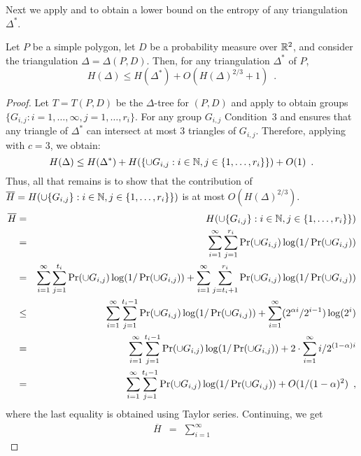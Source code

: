 \documentclass[lotsofwhite]{patmorin}
\begin{document}
Next we apply  and  to obtain a lower
bound on the entropy of any triangulation $\Delta^*$. 

\begin{lem}
Let $P$ be a simple polygon, let $D$ be a probability measure over
$\mathbb{R}^2$, and consider the triangulation $\Delta=\Delta(P,D)$.
Then, for any triangulation $\Delta^*$ of $P$,
\[
    H(\Delta) \le H(\Delta^*) + O(H(\Delta)^{2/3}+1) \enspace .
\]
\end{lem}

\begin{proof}
Let $T=T(P,D)$ be the $\Delta$-tree for $(P,D)$ and apply
 to obtain groups $\{G_{i,j}: i=1,\ldots,\infty,
j=1,\ldots,r_i\}$.  For any group $G_{i,j}$ Condition~3 and
 ensures that any triangle of
$\Delta^*$ can intersect at most 3 triangles of $G_{i,j}$.  Therefore,
applying  with $c=3$, we obtain:
\[ 
 H(\Delta) \le 
   H(\Delta^*) + H(\{{\cup G_{i,j}} : i\in\mathbb{N} , j\in\{1,\ldots,r_i\}\}) 
   + O(1)  \enspace .
\]
Thus, all that remains is to show that the contribution of $\overline
H=H(\cup\{G_{i,j}\} : i\in\mathbb{N} , j\in\{1,\ldots,r_i\}\})$ is at most
$O(H(\Delta)^{2/3})$. 
\begin{eqnarray*}
\overline H 
 & = & H(\cup\{G_{i,j}\} : i\in\mathbb{N} , j\in\{1,\ldots,r_i\}\}) \\
 & = & \sum_{i=1}^\infty
         \sum_{j=1}^{r_i}\Pr(\cup G_{i,j})\log(1/\Pr(\cup G_{i,j})) \\
 & = & \sum_{i=1}^\infty
         \sum_{j=1}^{t_i}\Pr(\cup G_{i,j})\log(1/\Pr(\cup G_{i,j})) 
         + \sum_{i=1}^\infty
         \sum_{j=t_i+1}^{r_i}\Pr(\cup G_{i,j})\log(1/\Pr(\cup G_{i,j})) \\
 & \le & \sum_{i=1}^\infty
         \sum_{j=1}^{t_i-1}\Pr(\cup G_{i,j})\log(1/\Pr(\cup G_{i,j})) 
         + \sum_{i=1}^{\infty} (2^{\alpha i}/ 2^{i-1})\log(2^i) \\
 &  =  & \sum_{i=1}^\infty
         \sum_{j=1}^{t_i-1}\Pr(\cup G_{i,j})\log(1/\Pr(\cup G_{i,j})) 
         + 2\cdot\sum_{i=1}^{\infty} i/2^{(1-\alpha)i} \\
 &  =  & \sum_{i=1}^\infty
         \sum_{j=1}^{t_i-1}\Pr(\cup G_{i,j})\log(1/\Pr(\cup G_{i,j}))
         + O(1/(1-\alpha)^2) \enspace ,
\end{eqnarray*}
where the last equality is obtained using Taylor series.
Continuing, we get 
\begin{eqnarray*}
\overline H
 &  =  & \sum_{i=1}^\infty

\end{eqnarray*}
\end{proof}
\end{document}
